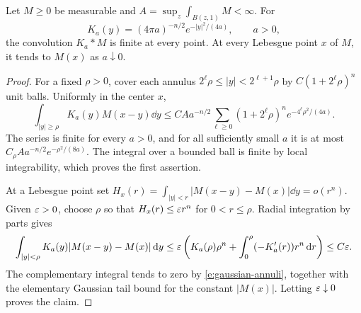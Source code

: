 \begin{lemma}
\label{e:gaussian-local}
Let $M\ge0$ be measurable and
$A=\sup_z\int_{B(z,1)}M<\infty$.  For
\[
 K_a(y)=(4\pi a)^{-n/2}e^{-|y|^2/(4a)},\qquad a>0,
\]
the convolution $K_a*M$ is finite at every point.  At every Lebesgue
point $x$ of $M$, it tends to $M(x)$ as $a\downarrow0$.
\end{lemma}

\begin{proof}
For a fixed $\rho>0$, cover each annulus
$2^\ell\rho\le|y|<2^{\ell+1}\rho$ by
$C(1+2^\ell\rho)^n$ unit balls.  Uniformly in the center $x$,
\begin{equation}
 \int_{|y|\ge\rho}K_a(y)M(x-y)\dd y
 \le C A a^{-n/2}\sum_{\ell\ge0}(1+2^\ell\rho)^n
                    e^{-4^\ell\rho^2/(4a)}.
 \label{e:gaussian-annuli}
\end{equation}
The series is finite for every $a>0$, and for all sufficiently small
$a$ it is at most $C_\rho A a^{-n/2}e^{-\rho^2/(8a)}$.
The integral over a bounded ball is finite by local integrability,
which proves the first assertion.

At a Lebesgue point set
$H_x(r)=\int_{|y|<r}|M(x-y)-M(x)|\dd y=o(r^n)$.
Given $\varepsilon>0$, choose $\rho$ so that $H_x(r)\le\varepsilon r^n$ for
$0<r\le\rho$.  Radial integration by parts gives
\[
 \int_{|y|<\rho}K_a(y)|M(x-y)-M(x)|\,\mathrm d y
 \le \varepsilon\left(K_a(\rho)\rho^n+
                  \int_0^\rho(-K_a'(r))r^n\,\mathrm d r\right)
 \le C\varepsilon.
\]
The complementary integral tends to zero by
\eqref{e:gaussian-annuli}, together with the elementary Gaussian tail
bound for the constant $|M(x)|$.  Letting $\varepsilon\downarrow0$ proves the
claim.
\end{proof}

